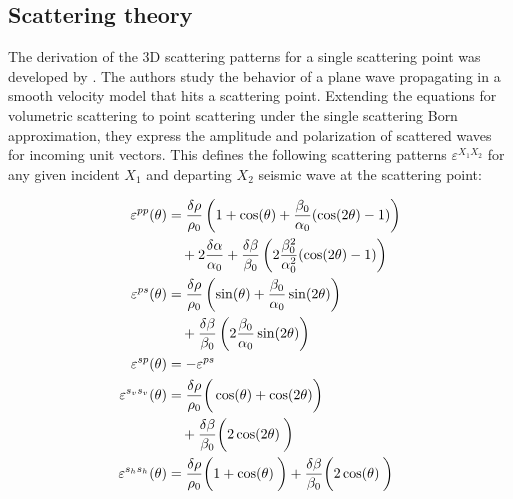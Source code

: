 \documentclass[9pt,a4paper]{article}
\numberwithin{equation}{section}
\begin{document}
\begin{multicols}{2}
\subsection{Scattering theory}

The derivation of the 3D scattering patterns for a single scattering point was developed by \cite{beyl_wamo_90}. 
The authors study the behavior of a plane wave propagating in a smooth velocity model that hits a scattering point.
Extending the equations for volumetric scattering to point scattering under the single scattering Born approximation, they express the amplitude and polarization of scattered waves for incoming unit vectors.
This defines the following scattering patterns $\varepsilon^{X_1X_2}$ for any given incident $X_1$ and departing $X_2$ seismic wave at the scattering point:

\begin{align}
  \varepsilon^{pp} (\theta) &= \dfrac{\delta \rho}{\rho_0} 
                               \left( 1 + \cos(\theta) + \dfrac{\beta_0}{\alpha_0} (\cos(2\theta)-1) \right) \notag
                   \\ & \quad + 2 \dfrac{\delta \alpha}{\alpha_0} 
                               + \dfrac{\delta \beta}{\beta_0} \left( 2 \dfrac{\beta_0^2}{\alpha_0^2} (\cos(2\theta)-1) \right)
\\
  \varepsilon^{ps} (\theta) &= \dfrac{\delta \rho}{\rho_0} 
                               \left( \sin(\theta) + \dfrac{\beta_0}{\alpha_0} \sin(2\theta) \right) \notag
                   \\ & \quad + \dfrac{\delta \beta}{\beta_0} \left( 2 \dfrac{\beta_0}{\alpha_0} \sin(2\theta) \right)
\\
  \varepsilon^{sp} (\theta) &= - \varepsilon^{ps}
\\
  \varepsilon^{s_vs_v} (\theta) &= \dfrac{\delta \rho}{\rho_0} 
                                   \bigg( \cos(\theta) + \cos(2\theta) \bigg) \notag
                       \\ & \quad + \dfrac{\delta \beta}{\beta_0} \bigg( 2 \cos(2\theta) \dfrac{}{} \bigg) 
\\
  \varepsilon^{s_hs_h} (\theta) &= \dfrac{\delta \rho}{\rho_0} 
                                   \bigg( 1 + \cos(\theta) \dfrac{}{} \bigg)
                                   + \dfrac{\delta \beta}{\beta_0} \bigg( 2 \cos(\theta) \dfrac{}{} \bigg)
\end{align}
\vspace{1mm}


\end{multicols}
\end{document}
